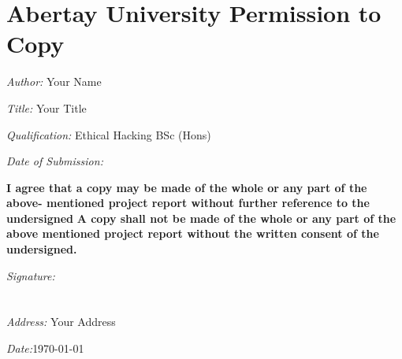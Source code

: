 \documentclass[dissertation.tex]{subfiles}
\begin{document}
	\section*{Abertay University Permission to Copy}
		\begingroup
		\setlength{\parskip}{2.5em}
		\setlength{\parindent}{0em}

		\textit{Author:} Your Name

		\textit{Title:} Your Title

		\textit{Qualification:} Ethical Hacking BSc (Hons)

		\textit{Date of Submission:}

		\textbf{I agree that a copy may be made of the whole or any part of the above- mentioned project report without further reference to the undersigned}
		\textbf{A copy shall not be made of the whole or any part of the above mentioned project report without the written consent of the undersigned.}

		\textit{Signature:}\\\\\\

		\textit{Address:} Your Address

		\textit{Date:}\today\par
		\endgroup
		\clearpage
\end{document}
